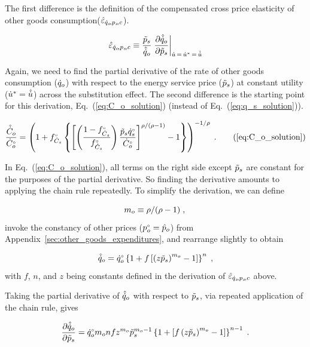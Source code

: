 \documentclass[12pt]{article}\usepackage[]{graphicx}\usepackage[]{xcolor}
\begin{document}
The first difference is 
the definition of the compensated cross price elasticity
of other goods consumption($\hat{\varepsilon}_{\dot{q}_o\!,p_s\!,c}$).

\begin{equation} \label{eq:eqopsC_def}
  \eqopsChat \equiv \frac{\amacro{p}_s}{\rasub{q}_o} \eval{\pdv{\rasub{q}_o}{\amacro{p}_s}}_{\rate{u} \, = \, \rbsub{u} \, = \, \rasub{u}}
\end{equation}

Again, we need to find the partial
derivative of the rate of other goods consumption ($\dot{q}_o$) 
with respect to the energy service price ($\tilde{p}_s$) 
at constant utility (${\dot{u}}^* = \hat{\dot{u}}$)
across the substitution effect.
The second difference is 
the starting point for this derivation, 
Eq.~(\ref{eq:C_o_solution}) 
(instead of Eq.~(\ref{eq:q_s_solution})).

\begin{equation}
  \frac{\rasub{C}_o}{\rbempl{C}_o} = \Cosolution{} \; . \tag{\ref{eq:C_o_solution}}
\end{equation}

In Eq.~(\ref{eq:C_o_solution}), all terms on the right side except $\tilde{p}_s$ are constant 
for the purposes of the partial derivative. 
So finding the derivative amounts to applying the chain rule repeatedly.
To simplify the derivation, 
we can define 

\begin{equation}
  m_o \equiv \rho / (\rho - 1) \; , \\
\end{equation}
%
invoke the constancy of other prices (${}{p}^{\scriptscriptstyle \circ}_o = \hat{p}_o$)
from Appendix~\ref{sec:other_goods_expenditures}, and
rearrange slightly to obtain

\begin{equation} 
  \hat{\dot{q}}_o = {}{\dot{q}}^{\scriptscriptstyle \circ}_o \left\{ 1 + f \left[ \left( z \tilde{p}_s \right)^{m_o} - 1 \right] \right\}^n \; ,
\end{equation}
%
with $f$, $n$, and $z$ being constants defined in the derivation of $\hat{\varepsilon}_{\dot{q}_s\!,p_s\!,c}$ above.

Taking the partial derivative of $\hat{\dot{q}}_o$ with respect to $\tilde{p}_s$, 
via repeated application of the chain rule, gives

\begin{equation}
  \pdv{\hat{\dot{q}}_o}{\tilde{p}_s} = {}{\dot{q}}^{\scriptscriptstyle \circ}_o m_o n f z^{m_o} \tilde{p}_s^{m_o-1} 
                \left\{ 1 + \left[ f \left( z \tilde{p}_s \right)^{m_o} - 1 \right] \right\}^{n-1} \; .
\end{equation}
\end{document}
